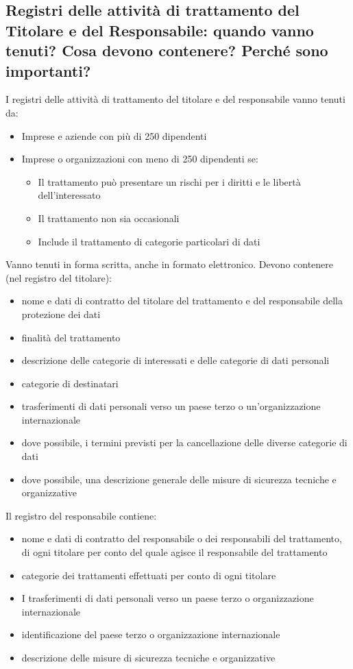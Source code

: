 \subsection{Registri delle attività di trattamento del Titolare e del Responsabile: quando vanno tenuti?
Cosa devono contenere? Perché sono importanti?}

I registri delle attività di trattamento del titolare e del responsabile vanno tenuti da:
\begin{itemize}
    \item Imprese e aziende con più di 250 dipendenti
    \item Imprese o organizzazioni con meno di 250 dipendenti se:
    \begin{itemize}
        \item Il trattamento può presentare un rischi per i diritti e le libertà dell'interessato
        \item Il trattamento non sia occasionali
        \item Include il trattamento di categorie particolari di dati
    \end{itemize}
\end{itemize}

Vanno tenuti in forma scritta, anche in formato elettronico.
Devono contenere (nel registro del titolare):
\begin{itemize}
    \item nome e dati di contratto del titolare del trattamento e del responsabile della protezione dei dati
    \item finalità del trattamento
    \item descrizione delle categorie di interessati e delle categorie di dati personali
    \item categorie di destinatari
    \item trasferimenti di dati personali verso un paese terzo o un'organizzazione internazionale
    \item dove possibile, i termini previsti per la cancellazione delle diverse categorie di dati
    \item dove possibile, una descrizione generale delle misure di sicurezza tecniche e organizzative
\end{itemize}
Il registro del responsabile contiene:
\begin{itemize}
    \item nome e dati di contratto del responsabile o dei responsabili del trattamento, di ogni titolare per conto del quale agisce il responsabile del trattamento
    \item categorie dei trattamenti effettuati per conto di ogni titolare
    \item I trasferimenti di dati personali verso un paese terzo o organizzazione internazionale
    \item identificazione del paese terzo o organizzazione internazionale
    \item descrizione delle misure di sicurezza tecniche e organizzative
\end{itemize}

